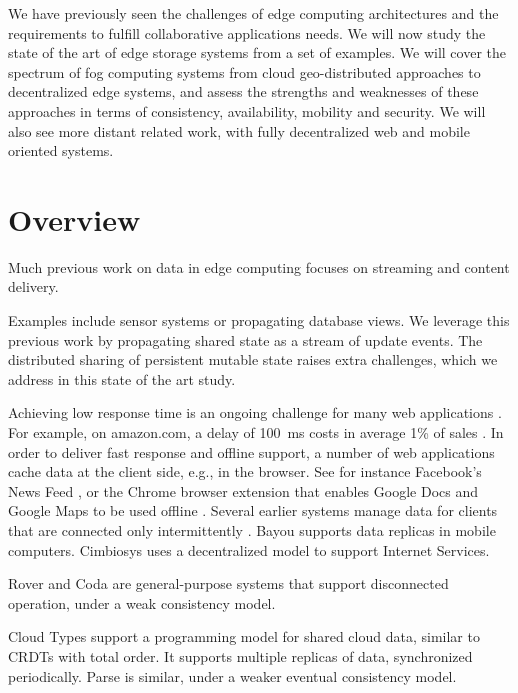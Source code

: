 
We have previously seen the challenges of edge computing architectures
and the requirements to fulfill collaborative applications needs.
We will now study the state of the art of edge storage systems from
a set of examples.
We will cover the spectrum of fog computing systems from cloud geo-distributed 
approaches to decentralized edge systems, 
and assess the strengths and weaknesses of these approaches
in terms of consistency, availability, mobility and security.
We will also see more distant related work,
with fully decentralized web and mobile oriented systems.


\section{Overview}

Much previous work on data in edge computing 
\cite{app:rep:1826, syn:optim:rep:1433, rep:1844}
focuses on streaming and content delivery.

Examples include sensor systems or propagating database views.
We leverage this previous work by propagating shared state as a
stream of update events.
The distributed sharing of persistent mutable state raises extra
challenges, which we address in this state of the art study.

Achieving low response time is an ongoing challenge for many web applications
\cite{akamai:2010:press, kohavi2007online, leighton2009improving}.
For example, on amazon.com, a delay of 100 ms costs in average 1\% of
sales \cite{kohavi2007online}.
In order to deliver fast response and offline support, a number of web
applications cache data at the client side, e.g., in the browser.
See for instance Facebook's News Feed \cite{facebook:newsfeed}, or the
Chrome browser extension that enables Google Docs and Google Maps to be
used offline \cite{googledocs:offline}.
Several earlier systems manage data for clients that are connected only
intermittently \cite{optim:rep:syn:1500,rep:syn:app:1728}.
Bayou \cite{syn:optim:rep:1433} supports data replicas in
mobile computers.
Cimbiosys \cite{app:rep:1826} uses a decentralized model to support
Internet Services.

Rover \cite{rep:1844} and Coda \cite{fic:rep:887} are general-purpose
systems that support disconnected operation, under a weak consistency
model.


Cloud Types \cite{syn:app:1761} support a programming
model for shared cloud data, similar to CRDTs with total order.
It supports multiple replicas of data, synchronized periodically.
Parse \cite{syn:app:1761} is similar, under a weaker eventual consistency
model.

